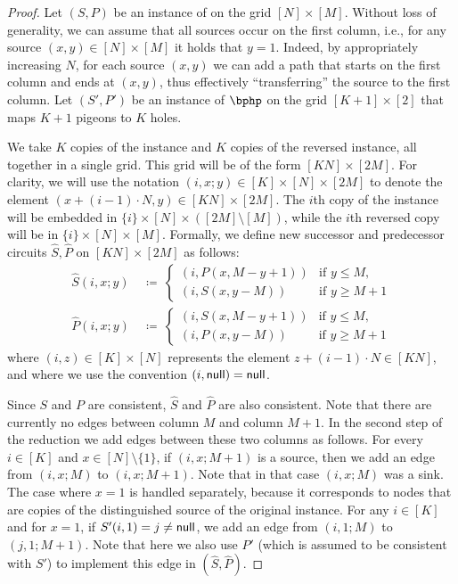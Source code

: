 \documentclass[10pt,a4paper]{article}
\theoremstyle{definition}
\theoremstyle{plain}
\theoremstyle{remark}
\newcommand{\nul}{\textup{\textsf{null}}}
\begin{document}
\begin{proof}
Let $(S,P)$ be an instance of \sopl on the grid $[N] \times [M]$. Without loss of generality, we can assume that all sources occur on the first column, i.e., for any source $(x,y) \in [N] \times [M]$ it holds that $y=1$. Indeed, by appropriately increasing $N$, for each source $(x,y)$ we can add a path that starts on the first column and ends at $(x,y)$, thus effectively ``transferring'' the source to the first column. Let $(S',P')$ be an instance of $\bphp$ on the grid $[K+1] \times [2]$ that maps $K+1$ pigeons to $K$ holes.

We take $K$ copies of the \sopl instance and $K$ copies of the reversed \sopl instance, all together in a single grid. This grid will be of the form $[KN] \times [2M]$. For clarity, we will use the notation $(i,x;y) \in [K] \times [N] \times [2M]$ to denote the element $(x + (i-1) \cdot N,y) \in [KN] \times [2M]$. The $i$th copy of the instance will be embedded in $\{i\} \times [N] \times ([2M] \setminus [M])$, while the $i$th reversed copy will be in $\{i\} \times [N] \times [M]$. Formally, we define new successor and predecessor circuits $\widehat{S}, \widehat{P}$ on $[KN] \times [2M]$ as follows:
\begin{align*}
    \widehat{S}(i,x;y)
    &~\coloneqq~
    \begin{cases}
    (i,P(x,M-y+1)) & \text{if } y \leq M,\\
    (i,S(x,y-M)) & \text{if } y \geq M+1
    \end{cases}\\[1em]
    \widehat{P}(i,x;y)
    &~\coloneqq~
    \begin{cases}
    (i,S(x,M-y+1)) & \text{if } y \leq M,\\
    (i,P(x,y-M)) & \text{if } y \geq M+1
    \end{cases}
\end{align*}
where $(i,z) \in [K] \times [N]$ represents the element $z + (i-1) \cdot N \in [KN]$, and where we use the convention $(i,\nul) = \nul$.

Since $S$ and $P$ are consistent, $\widehat{S}$ and $\widehat{P}$ are also consistent. Note that there are currently no edges between column $M$ and column $M+1$. In the second step of the reduction we add edges between these two columns as follows. For every $i \in [K]$ and $x \in [N] \setminus \{1\}$, if $(i,x;M+1)$ is a source, then we add an edge from $(i,x;M)$ to $(i,x;M+1)$. Note that in that case $(i,x;M)$ was a sink. The case where $x=1$ is handled separately, because it corresponds to nodes that are copies of the distinguished source of the original \sopl instance. For any $i \in [K]$ and for $x=1$, if $S'(i,1) = j \neq \nul$, we add an edge from $(i,1;M)$ to $(j,1;M+1)$. Note that here we also use $P'$ (which is assumed to be consistent with $S'$) to implement this edge in $(\widehat{S},\widehat{P})$.


\end{proof}
\end{document}
